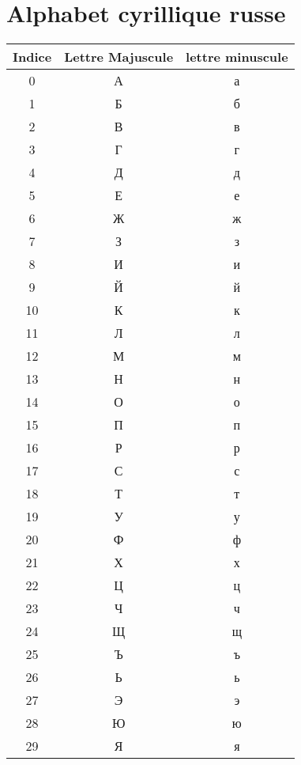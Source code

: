 \documentclass[12pt,a4paper]{article}
\begin{document}
\section{Alphabet cyrillique russe}
\begin{center}
 \begin{tabular}{c|c|c}
    Indice & Lettre Majuscule & lettre minuscule \\
    \hline
    0 & \textrussian{А} & \textrussian{а} \\
    1 & \textrussian{Б} & \textrussian{б} \\
    2 & \textrussian{В} & \textrussian{в} \\
    3 & \textrussian{Г} & \textrussian{г} \\
    4 & \textrussian{Д} & \textrussian{д} \\
    5 & \textrussian{Е} & \textrussian{е} \\
    6 & \textrussian{Ж} & \textrussian{ж} \\
    7 & \textrussian{З} & \textrussian{з} \\
    8 & \textrussian{И} & \textrussian{и} \\
    9 & \textrussian{Й} & \textrussian{й} \\
    10 & \textrussian{К} & \textrussian{к} \\
    11 & \textrussian{Л} & \textrussian{л} \\
    12 & \textrussian{М} & \textrussian{м} \\
    13 & \textrussian{Н} & \textrussian{н} \\
    14 & \textrussian{О} & \textrussian{о} \\
    15 & \textrussian{П} & \textrussian{п} \\
    16 & \textrussian{Р} & \textrussian{р} \\
    17 & \textrussian{С} & \textrussian{с} \\
    18 & \textrussian{Т} & \textrussian{т} \\
    19 & \textrussian{У} & \textrussian{у} \\
    20 & \textrussian{Ф} & \textrussian{ф} \\
    21 & \textrussian{Х} & \textrussian{х} \\
    22 & \textrussian{Ц} & \textrussian{ц} \\
    23 & \textrussian{Ч} & \textrussian{ч} \\
    24 & \textrussian{Щ} & \textrussian{щ} \\
    25 & \textrussian{Ъ} & \textrussian{ъ} \\
    26 & \textrussian{Ь} & \textrussian{ь} \\
    27 & \textrussian{Э} & \textrussian{э} \\
    28 & \textrussian{Ю} & \textrussian{ю} \\
    29 & \textrussian{Я} & \textrussian{я} \\
  \end{tabular}
\end{center}
\end{document}
